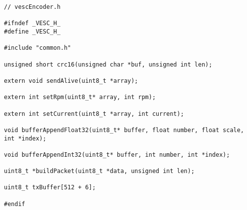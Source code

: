 \begin{lstlisting}
// vescEncoder.h

#ifndef _VESC_H_
#define _VESC_H_

#include "common.h"

unsigned short crc16(unsigned char *buf, unsigned int len);

extern void sendAlive(uint8_t *array);

extern int setRpm(uint8_t* array, int rpm);

extern int setCurrent(uint8_t *array, int current);

void bufferAppendFloat32(uint8_t* buffer, float number, float scale, int *index);

void bufferAppendInt32(uint8_t* buffer, int number, int *index);

uint8_t *buildPacket(uint8_t *data, unsigned int len);

uint8_t txBuffer[512 + 6];

#endif
\end{lstlisting}

